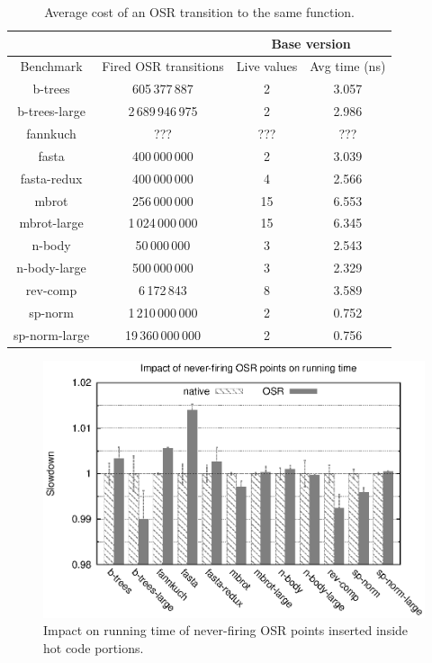 \begin{table} 
\begin{footnotesize}
    \begin{tabular}{ |c|c|c|c| }
        \multicolumn{2}{c|}{} & \multicolumn{2}{c}{Base version} \\
        \hline
        Benchmark & Fired OSR transitions & Live values & Avg time (ns) \\ 
        \hline
        \hline
        b-trees & 605\,377\,887 & 2 & 3.057 \\ 
        \hline
        b-trees-large & 2\,689\,946\,975 & 2 & 2.986 \\ 
        \hline
        fannkuch & ??? & ??? & ??? \\ 
        \hline
        fasta & 400\,000\,000 & 2 & 3.039 \\ 
        \hline
        fasta-redux & 400\,000\,000 & 4 & 2.566 \\ 
        \hline
        mbrot & 256\,000\,000 & 15 & 6.553 \\ 
        \hline
        mbrot-large & 1\,024\,000\,000 & 15 & 6.345 \\ 
        \hline
        n-body & 50\,000\,000 & 3 & 2.543 \\ 
        \hline
        n-body-large & 500\,000\,000 & 3 & 2.329 \\ 
        \hline
        rev-comp & 6\,172\,843 & 8 & 3.589 \\ 
        \hline
        sp-norm & 1\,210\,000\,000 & 2 & 0.752 \\ 
        \hline
        sp-norm-large & 19\,360\,000\,000 & 2 & 0.756 \\
        \hline
    \end{tabular} 
\end{footnotesize}
\caption{\label{tab:sameFun}Average cost of an OSR transition to the same function.} 
\end{table}

\ifdefined\noauthorea
\begin{figure}[t]
\begin{center}
\includegraphics[width=0.95\columnwidth]{figures/code-quality-noBB/code-quality-noBB.eps}
\caption{\label{fig:code-quality} Impact on running time of never-firing OSR points inserted inside hot code portions.}
\end{center}
\end{figure}
\fi

